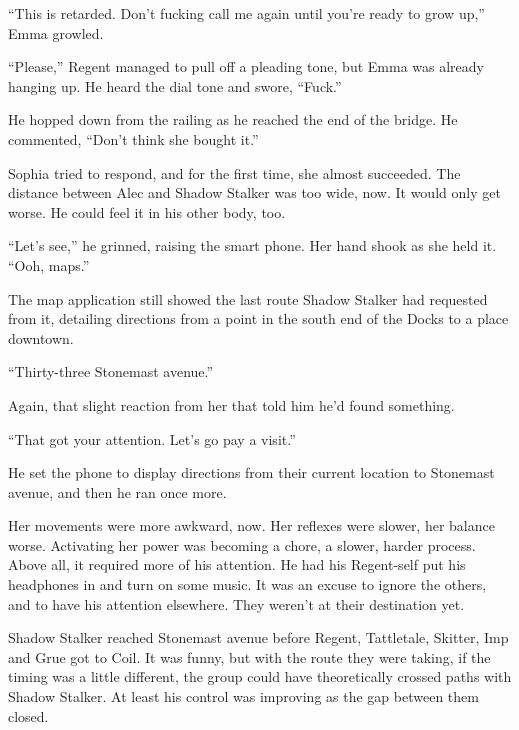 ``This is retarded.  Don't fucking call me again until you're ready to grow up,'' Emma growled.



``Please,'' Regent managed to pull off a pleading tone, but Emma was already hanging up.  He heard the dial tone and swore, ``Fuck.''



He hopped down from the railing as he reached the end of the bridge.  He commented,  ``Don't think she bought it.''



Sophia tried to respond, and for the first time, she almost succeeded.  The distance between Alec and Shadow Stalker was too wide, now.  It would only get worse.  He could feel it in his other body, too.



``Let's see,'' he grinned, raising the smart phone.  Her hand shook as she held it.  ``Ooh, maps.''



The map application still showed the last route Shadow Stalker had requested from it, detailing directions from a point in the south end of the Docks to a place downtown.



``Thirty-three Stonemast avenue.''



Again, that slight reaction from her that told him he'd found something.



``That got your attention.  Let's go pay a visit.''



He set the phone to display directions from their current location to Stonemast avenue, and then he ran once more.



Her movements were more awkward, now.  Her reflexes were slower, her balance worse.  Activating her power was becoming a chore, a slower, harder process.  Above all, it required more of his attention.  He had his Regent-self put his headphones in and turn on some music.  It was an excuse to ignore the others, and to have his attention elsewhere.  They weren't at their destination yet.



Shadow Stalker reached Stonemast avenue before Regent, Tattletale, Skitter, Imp and Grue got to Coil.  It was funny, but with the route they were taking, if the timing was a little different, the group could have theoretically crossed paths with Shadow Stalker.  At least his control was improving as the gap between them closed.



